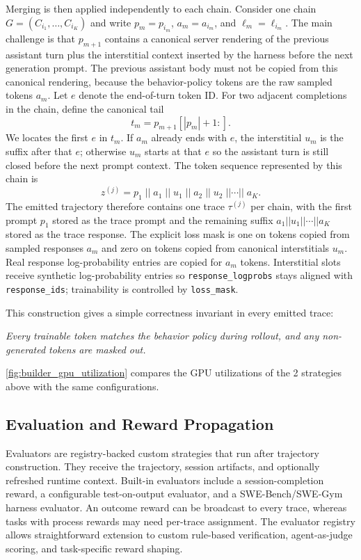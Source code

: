 Merging is then applied independently to each chain. Consider one chain $G=(C_{i_1},\ldots,C_{i_K})$ and write $p_m=p_{i_m}$, $a_m=a_{i_m}$, and $\ell_m=\ell_{i_m}$. The main challenge is that $p_{m+1}$ contains a canonical server rendering of the previous assistant turn plus the interstitial context inserted by the harness before the next generation prompt. The previous assistant body must not be copied from this canonical rendering, because the behavior-policy tokens are the raw sampled tokens $a_m$. Let $e$ denote the end-of-turn token ID. For two adjacent completions in the chain, define the canonical tail
\[
t_m = p_{m+1}[|p_m|+1:].
\]
We locates the first $e$ in $t_m$. If $a_m$ already ends with $e$, the interstitial $u_m$ is the suffix after that $e$; otherwise $u_m$ starts at that $e$ so the assistant turn is still closed before the next prompt context. The token sequence represented by this chain is
\[
z^{(j)} = p_1 \; || \; a_1 \; || \; u_1 \; || \; a_2 \; || \; u_2 \; || \cdots || \; a_K .
\]
The emitted trajectory therefore contains one trace $\tau^{(j)}$ per chain, with the first prompt $p_1$ stored as the trace prompt and the remaining suffix $a_1 || u_1 || \cdots || a_K$ stored as the trace response. The explicit loss mask is one on tokens copied from sampled responses $a_m$ and zero on tokens copied from canonical interstitials $u_m$. Real response log-probability entries are copied for $a_m$ tokens. Interstitial slots receive synthetic log-probability entries so \texttt{response\_logprobs} stays aligned with \texttt{response\_ids}; trainability is controlled by \texttt{loss\_mask}.

This construction gives a simple correctness invariant in every emitted trace:
\begin{center}
    \emph{Every trainable token matches the behavior policy during rollout, and any non-generated tokens are masked out.}
\end{center}


\cref{fig:builder_gpu_utilization} compares the GPU utilizations of the 2 strategies above with the same configurations.

\subsection{Evaluation and Reward Propagation}

Evaluators are registry-backed custom strategies that run after trajectory construction. They receive the trajectory, session artifacts, and optionally refreshed runtime context. Built-in evaluators include a session-completion reward, a configurable test-on-output evaluator, and a SWE-Bench/SWE-Gym harness evaluator. An outcome reward can be broadcast to every trace, whereas tasks with process rewards may need per-trace assignment.
The evaluator registry allows straightforward extension to custom rule-based verification, agent-as-judge scoring, and task-specific reward shaping.
